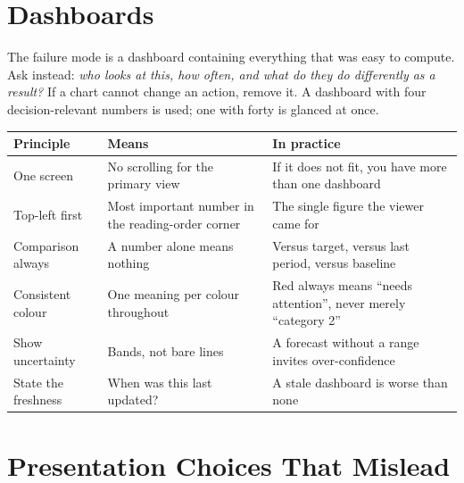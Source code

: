 \section{Dashboards}

\begin{alertbox}
The failure mode is a dashboard containing everything that was easy to compute. Ask
instead: \emph{who looks at this, how often, and what do they do differently as a
result?} If a chart cannot change an action, remove it. A dashboard with four
decision-relevant numbers is used; one with forty is glanced at once.
\end{alertbox}

\begin{longtable}{@{}L{3.0cm}L{4.5cm}L{6.5cm}@{}}
\toprule
{}
\textbf{Principle} & \textbf{Means} & \textbf{In practice} \\
\midrule
\endhead
One screen & No scrolling for the primary view & If it does not fit, you have more than one dashboard \\
Top-left first & Most important number in the reading-order corner & The single figure the viewer came for \\
Comparison always & A number alone means nothing & Versus target, versus last period, versus baseline \\
Consistent colour & One meaning per colour throughout & Red always means ``needs attention'', never merely ``category 2'' \\
Show uncertainty & Bands, not bare lines & A forecast without a range invites over-confidence \\
State the freshness & When was this last updated? & A stale dashboard is worse than none \\
\bottomrule
\end{longtable}

\section{Presentation Choices That Mislead}

